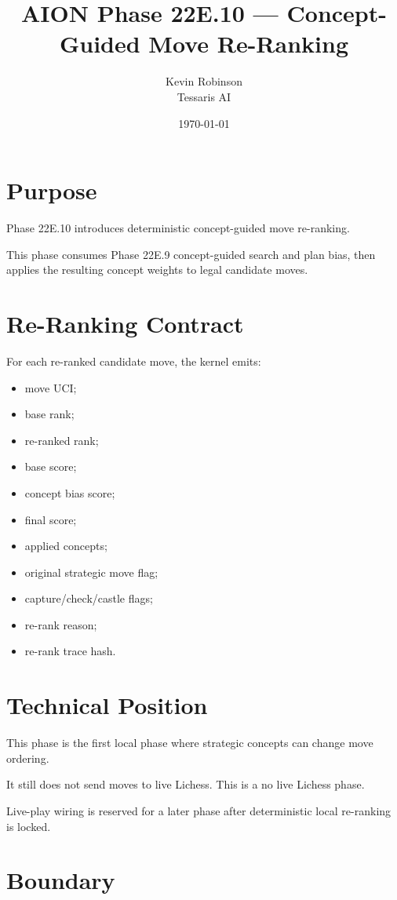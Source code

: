 \documentclass[11pt,a4paper]{article}
\title{\textbf{AION Phase 22E.10 --- Concept-Guided Move Re-Ranking}}
\author{Kevin Robinson\\Tessaris AI}
\date{\today}
\begin{document}
\maketitle

\section{Purpose}

Phase 22E.10 introduces deterministic concept-guided move re-ranking.

This phase consumes Phase 22E.9 concept-guided search and plan bias, then applies the resulting concept weights to legal candidate moves.

\section{Re-Ranking Contract}

For each re-ranked candidate move, the kernel emits:

\begin{itemize}[leftmargin=*]
  \item move UCI;
  \item base rank;
  \item re-ranked rank;
  \item base score;
  \item concept bias score;
  \item final score;
  \item applied concepts;
  \item original strategic move flag;
  \item capture/check/castle flags;
  \item re-rank reason;
  \item re-rank trace hash.
\end{itemize}

\section{Technical Position}

This phase is the first local phase where strategic concepts can change move ordering.

It still does not send moves to live Lichess. This is a no live Lichess phase.

Live-play wiring is reserved for a later phase after deterministic local re-ranking is locked.

\section{Boundary}
\end{document}
